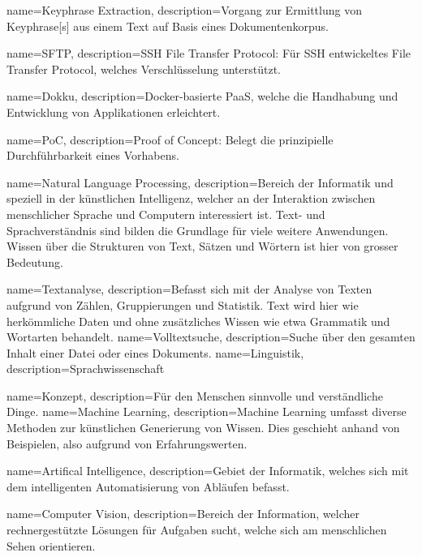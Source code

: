 {
    name=Keyphrase Extraction,
    description={Vorgang zur Ermittlung von \gls{Keyphrase}[s] aus einem Text auf Basis eines Dokumentenkorpus.}
}

{
    name=SFTP,
    description={SSH File Transfer Protocol: Für \gls{SSH} entwickeltes File Transfer Protocol, welches Verschlüsselung unterstützt.}
}

{
    name=Dokku,
    description={Docker-basierte PaaS, welche die Handhabung und Entwicklung von Applikationen erleichtert.}
}

{
    name=PoC,
    description={Proof of Concept: Belegt die prinzipielle Durchführbarkeit eines Vorhabens.}
}

{
    name=Natural Language Processing,
    description={Bereich der Informatik und speziell in der künstlichen Intelligenz, welcher an der Interaktion zwischen menschlicher Sprache und Computern interessiert ist. Text- und Sprachverständnis sind bilden die Grundlage für viele weitere Anwendungen. Wissen über die Strukturen von Text, Sätzen und Wörtern ist hier von grosser Bedeutung.}
}

{
    name=Textanalyse,
    description={Befasst sich mit der Analyse von Texten aufgrund von Zählen, Gruppierungen und Statistik. Text wird hier wie her\-köm\-mliche Daten und ohne zusätzliches Wissen wie etwa Grammatik und Wortarten behandelt.}
}
{
    name=Volltextsuche,
    description={Suche über den gesamten Inhalt einer Datei oder eines Dokuments.}
}
{
    name=Linguistik,
    description={Sprachwissenschaft}
}

{
    name=Konzept,
    description={Für den Menschen sinnvolle und verständliche Dinge.}
}
{
    name=Machine Learning,
    description={Machine Learning umfasst diverse Methoden zur künstlichen Generierung von Wissen. Dies geschieht anhand von Beispielen, also aufgrund von Erfahrungswerten.}
}

{
    name=Artifical Intelligence,
    description={Gebiet der Informatik, welches sich mit dem intelligenten Automatisierung von Abläufen befasst.}
}

{
    name=Computer Vision,
    description={Bereich der Information, welcher rechnergestützte Lösungen für Aufgaben sucht, welche sich am menschlichen Sehen orientieren.}
}


